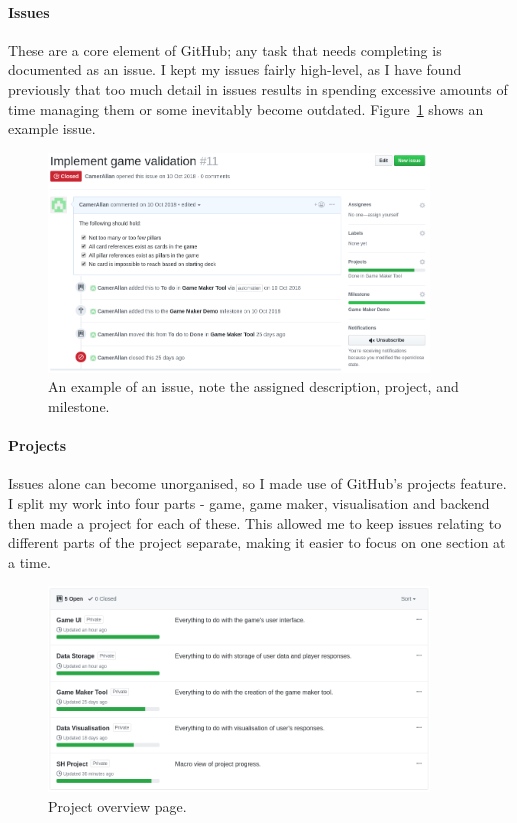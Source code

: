 \paragraph{Issues} These are a core element of GitHub; any task that needs completing is documented as an issue.
I kept my issues fairly high-level, as I have found previously that too much detail in issues results in spending excessive amounts of time managing them or some inevitably become outdated. Figure~\ref{fig:issue} shows an example issue.

\begin{figure}[!h]
	\centering
	\includegraphics[width=0.9\textwidth]{./images/softeng/issue.png}
	\caption{An example of an issue, note the assigned description, project, and milestone.}
	\label{fig:issue}
\end{figure}

\paragraph{Projects} Issues alone can become unorganised, so I made use of GitHub's projects feature. 
I split my work into four parts - game, game maker, visualisation and backend then made a project for each of these. 
This allowed me to keep issues relating to different parts of the project separate, making it easier to focus on one section at a time.

\begin{figure}[!h]
	\centering
	\includegraphics[width=0.9\textwidth]{./images/softeng/projects.png}
	\caption{Project overview page.}
	\label{fig:projects}
\end{figure}

